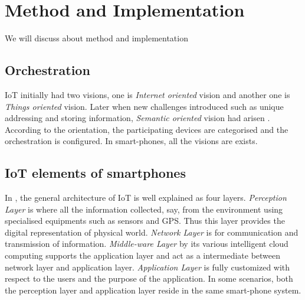 \chapter{Method and Implementation}

We will discuss about method and implementation

\section{Orchestration}


IoT initially had two visions, one is \textit{Internet oriented} vision and another one is \textit{Things oriented} vision. Later when new challenges introduced such as unique addressing and storing information, \emph{Semantic oriented} vision had arisen \cite{IoT:Survey}. According to the orientation, the participating devices are categorised and the orchestration is configured. In smart-phones, all the visions are exists. 
\section{IoT elements of smartphones}
In \cite{IoT:Arch}, the general architecture of IoT is well explained as four layers. \emph{Perception Layer} is where all the information collected, say, from the environment using specialised equipments such as sensors and GPS. Thus this layer provides the digital representation of physical world. \emph{Network Layer} is for communication and transmission of information. \emph{Middle-ware Layer} by its various intelligent cloud computing supports the application layer and act as a intermediate between network layer and application layer. \emph{Application Layer} is fully customized with respect to the users and the purpose of the application. In some scenarios, both the perception layer and application layer reside in the same smart-phone system.
